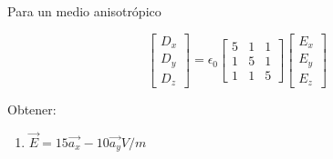 \begin{problema}
    Para un medio anisotrópico

$$
\left[\begin{array}{l}
D_{x} \\
D_{y} \\
D_{z}
\end{array}\right]=\epsilon_{0}\left[\begin{array}{lll}
5 & 1 & 1 \\
1 & 5 & 1 \\
1 & 1 & 5
\end{array}\right]\left[\begin{array}{l}
E_{x} \\
E_{y} \\
E_{z}
\end{array}\right]
$$

Obtener: 

\begin{enumerate}
    \item $\vec{E}=15 \overrightarrow{a_{x}}-10 \overrightarrow{a_{y}} V / m$
    \begin{sol}


\end{sol}
\end{enumerate}
\end{problema}
